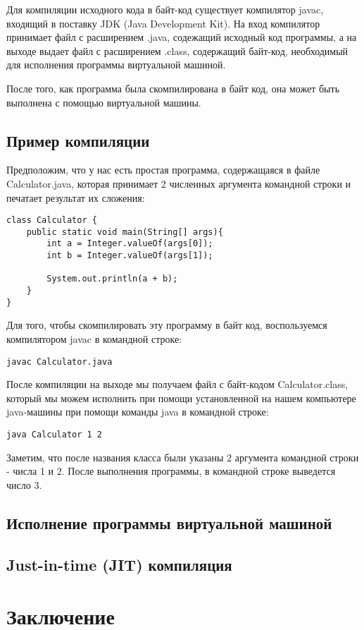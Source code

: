 \documentclass[]{scrartcl}
\begin{document}
Для компиляции исходного кода в байт-код существует компилятор javac, входящий в поставку JDK (Java Development Kit). На вход компилятор принимает файл с расширением .java, содежащий исходный код программы, а на выходе выдает файл с расширением .class, содержащий байт-код, необходимый для исполнения программы виртуальной машиной.

После того, как программа была скомпилирована в байт код, она может быть выполнена с помощью виртуальной машины.

\subsection{Пример компиляции}

Предположим, что у нас есть простая программа, содержащаяся в файле Calculator.java, которая принимает 2 численных аргумента командной строки и печатает результат их сложения:

\begin{lstlisting}
class Calculator {
	public static void main(String[] args){
		int a = Integer.valueOf(args[0]);
		int b = Integer.valueOf(args[1]);

		System.out.println(a + b);
	}
}
\end{lstlisting}

Для того, чтобы скомпилировать эту программу в байт код, воспользуемся компилятором javac в командной строке:

\begin{lstlisting}
javac Calculator.java
\end{lstlisting}

После компиляции на выходе мы получаем файл с байт-кодом Calculator.class, который мы можем исполнить при помощи установленной на нашем компьютере java-машины при помощи команды java в командной строке:

\begin{lstlisting}
java Calculator 1 2
\end{lstlisting}

Заметим, что после названия класса были указаны 2 аргумента командной строки - числа 1 и 2. После выполнения программы, в командной строке выведется число 3.

\subsection{Исполнение программы виртуальной машиной}

\subsection{Just-in-time (JIT) компиляция}

\section{Заключение}
\end{document}
